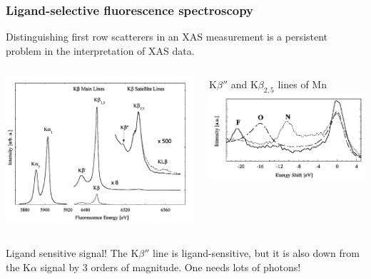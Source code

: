 \documentclass[10pt, xcolor=x11names, compress]{beamer}
\begin{document}
\begin{frame}
  \frametitle{Ligand-selective fluorescence spectroscopy}

  Distinguishing first row scatterers in an XAS measurement is a
  persistent problem in the interpretation of XAS data.

  \begin{columns}
    \begin{column}{0.5\linewidth}
      \begin{center}
        \includegraphics[width=0.9\linewidth]{pses/XES/lines.png}
      \end{center}
    \end{column}
    \begin{column}{0.5\linewidth}
      \begin{center}
        K$\beta''$ and K$\beta_{2,5}$ lines of Mn\\
        \includegraphics[width=\linewidth]{pses/XES/ligand.png}
      \end{center}
    \end{column}
  \end{columns}
  \begin{exampleblock}{Ligand sensitive signal!}
    The K$\beta''$ line is ligand-sensitive, but it is also down from
    the K$\alpha$ signal by 3 orders of magnitude.  One needs lots of
    photons!
  \end{exampleblock}


\end{frame}
\end{document}
